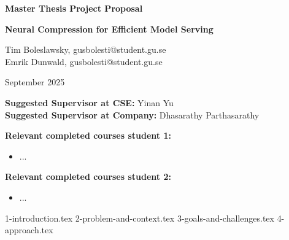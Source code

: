 \documentclass{article}
\begin{document}
\thispagestyle{plain}
\pagestyle{plain}

\begin{center}
\vspace{2cm}

{\Large \textbf{Master Thesis Project Proposal}}

\vspace{1cm}

{\huge \textbf{Neural Compression for Efficient Model Serving}}

\vspace{2cm}

{\large 
Tim Boleslawsky, gusbolesti@student.gu.se \\
\vspace{0.5cm}
Emrik Dunwald, gusbolesti@student.gu.se
}

\vspace{1.5cm}

{\large September 2025}

\vspace{2cm}

\textbf{Suggested Supervisor at CSE:} Yinan Yu \\
\vspace{0.5cm}
\textbf{Suggested Supervisor at Company:} Dhasarathy Parthasarathy

\vspace{2cm}

\end{center}

\textbf{Relevant completed courses student 1:}
\begin{itemize}
    \item ...
\end{itemize}   

\textbf{Relevant completed courses student 2:}
\begin{itemize}
    \item ...   
\end{itemize}

\newpage

{1-introduction.tex}
{2-problem-and-context.tex}
{3-goals-and-challenges.tex}
{4-approach.tex}




\vspace{12pt}
\end{document}
